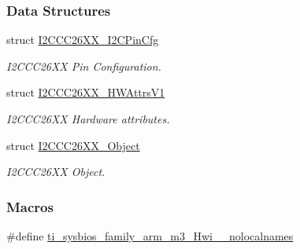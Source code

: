 \subsubsection*{Data Structures}
\begin{DoxyCompactItemize}
\item 
struct \hyperlink{struct_i2_c_c_c26_x_x___i2_c_pin_cfg}{I2\+C\+C\+C26\+X\+X\+\_\+\+I2\+C\+Pin\+Cfg}
\begin{DoxyCompactList}\small\item\em I2\+C\+C\+C26\+X\+X Pin Configuration. \end{DoxyCompactList}\item 
struct \hyperlink{struct_i2_c_c_c26_x_x___h_w_attrs_v1}{I2\+C\+C\+C26\+X\+X\+\_\+\+H\+W\+Attrs\+V1}
\begin{DoxyCompactList}\small\item\em I2\+C\+C\+C26\+X\+X Hardware attributes. \end{DoxyCompactList}\item 
struct \hyperlink{struct_i2_c_c_c26_x_x___object}{I2\+C\+C\+C26\+X\+X\+\_\+\+Object}
\begin{DoxyCompactList}\small\item\em I2\+C\+C\+C26\+X\+X Object. \end{DoxyCompactList}\end{DoxyCompactItemize}
\subsubsection*{Macros}
\begin{DoxyCompactItemize}
\item 
\#define \hyperlink{_i2_c_c_c26_x_x_8h_aaa17ecf48f5762e2e1bdb0bab8aacf0c}{ti\+\_\+sysbios\+\_\+family\+\_\+arm\+\_\+m3\+\_\+\+Hwi\+\_\+\+\_\+nolocalnames}
\end{DoxyCompactItemize}
